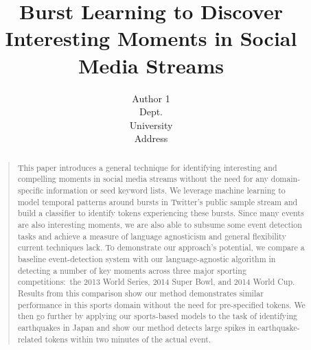 \documentclass[letterpaper]{article}
\begin{document}
%
\title{Burst Learning to Discover Interesting Moments in Social Media Streams}
\author{Author 1\\
Dept. \\
University \\
Address \\
}
\maketitle
\begin{abstract}
\begin{quote}
This paper introduces a general technique for identifying interesting and compelling moments in social media streams without the need for any domain-specific information or seed keyword lists.
We leverage machine learning to model temporal patterns around bursts in Twitter's public sample stream and build a classifier to identify tokens experiencing these bursts.
Since many events are also interesting moments, we are also able to subsume some event detection tasks and achieve a measure of language agnosticism and general flexibility current techniques lack. 
To demonstrate our approach's potential, we compare a baseline event-detection system with our language-agnostic algorithm in detecting a number of key moments across three major sporting competitions:\ the 2013 World Series, 2014 Super Bowl, and 2014 World Cup.
Results from this comparison show our method demonstrates similar performance in this sports domain without the need for pre-specified tokens.
We then go further by applying our sports-based models to the task of identifying earthquakes in Japan and show our method detects large spikes in earthquake-related tokens within two minutes of the actual event.
\end{quote}
\end{abstract}

%
\end{document}
